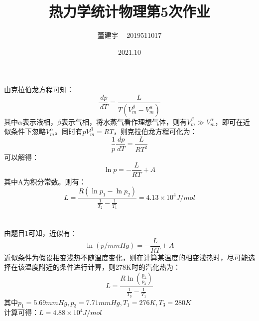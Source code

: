 \documentclass[a4paper,12pt]{article}
\title{热力学统计物理第5次作业}
\date{2021.10}
\author{董建宇 ~ 2019511017}
\begin{document}
\maketitle

\titleformat{\section}[hang]{\small}{\thesection}{0.8em}{}{}
\titleformat{\subsection}[hang]{\small}{\thesubsection}{0.8em}{}{}

\section{}
由克拉伯龙方程可知：
\begin{equation}\nonumber
	\frac{\,dp}{\,dT} = \frac{L}{T\left(V_m^{\beta} - V_m^{\alpha}\right)}
\end{equation}
其中$\alpha$表示液相，$\beta$表示气相，将水蒸气看作理想气体，则有$V_m^{\beta} \gg V_m^{\alpha}$，即可在近似条件下忽略$V_m^{\alpha}$。同时有$pV_m^{\beta} = RT$，则克拉伯龙方程可化为：
\begin{equation}\nonumber
	\frac{1}{p}\frac{\,dp}{\,dT} = \frac{L}{RT^2}
\end{equation}
可以解得：
\begin{equation}\nonumber
	\ln p = -\frac{L}{RT} + A
\end{equation}
其中A为积分常数。则有：
\begin{equation}\nonumber
	L = \frac{R\left(\ln p_1 - \ln p_2\right)}{\frac{1}{T_2} - \frac{1}{T_1}} = 4.13\times 10^4 J/mol
\end{equation}


\section{}
由题目1可知，近似有：
\begin{equation}\nonumber
	\ln (p/mmHg) = -\frac{L}{RT} + A
\end{equation}
近似条件为假设相变浅热不随温度变化，则在计算某温度的相变浅热时，尽可能选择在该温度附近的条件进行计算，则278K时的汽化热为：
\begin{equation}\nonumber
	L = \frac{R \ln \left(\frac{p_1}{p_3}\right)}{\frac{1}{T_3} - \frac{1}{T_1}}
\end{equation}
其中$p_1 = 5.69mmHg, p_3 = 7.71mmHg, T_1 = 276K, T_3 = 280K$ \\
计算可得：$L = 4.88\times 10^4 J/mol$
\end{document}
